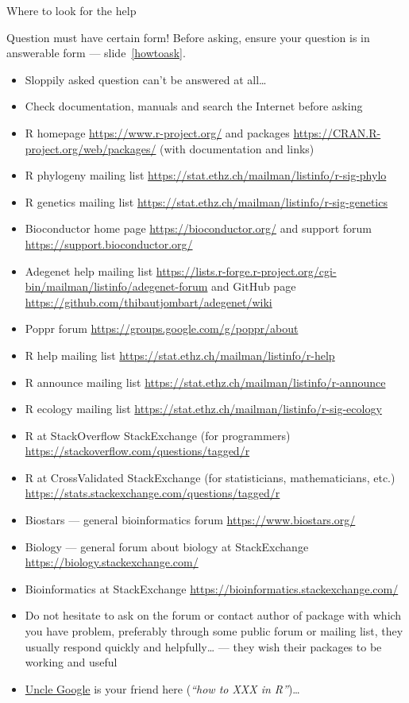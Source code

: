 \documentclass[compress, xelatex, 11pt, xcolor=svgnames, aspectratio=169,
	hyperref={
		bookmarks=true,
		unicode=true,
		colorlinks=true,
		pdftitle={Molecular data in R},
		plainpages=false,
		pdfauthor={Vojtech Zeisek},
		pdfsubject={Course about phylogeny and evolution in R},
		pdfcreator={XeLaTeX},
		pdfkeywords={R, evolution, phylogeny, molecular data},
		linkcolor=Crimson, %
		anchorcolor=Magenta, %
		citecolor=Magenta, %
		filecolor=Magenta, %
		menucolor=Magenta, %
		urlcolor=DodgerBlue, %
		},
	url={hyphens, lowtilde} %
	]{beamer}
\begin{document}
\begin{frame}[allowframebreaks]{Where to look for the help}
	\label{help}
	\begin{alertblock}{Question must have certain form!}
			Before asking, \alert{ensure your question is in answerable form} --- slide~\ref{howtoask}.
		\begin{itemize}
			\item Sloppily asked question can't be answered at all\ldots
			\item Check documentation, manuals and search the Internet before asking
		\end{itemize}
	\end{alertblock}
	\begin{itemize}
		\item R homepage \url{https://www.r-project.org/} and packages \url{https://CRAN.R-project.org/web/packages/} (with documentation and links)
		\item R phylogeny mailing list \url{https://stat.ethz.ch/mailman/listinfo/r-sig-phylo}
		\item R genetics mailing list \url{https://stat.ethz.ch/mailman/listinfo/r-sig-genetics}
		\item Bioconductor home page \url{https://bioconductor.org/} and support forum \url{https://support.bioconductor.org/}
		\item Adegenet help mailing list \url{https://lists.r-forge.r-project.org/cgi-bin/mailman/listinfo/adegenet-forum} and GitHub page \url{https://github.com/thibautjombart/adegenet/wiki}
		\item Poppr forum \url{https://groups.google.com/g/poppr/about}
		\item R help mailing list \url{https://stat.ethz.ch/mailman/listinfo/r-help}
		\item R announce mailing list \url{https://stat.ethz.ch/mailman/listinfo/r-announce}
		\item R ecology mailing list \url{https://stat.ethz.ch/mailman/listinfo/r-sig-ecology}
		\item R at StackOverflow StackExchange (for programmers) \url{https://stackoverflow.com/questions/tagged/r}
		\item R at CrossValidated StackExchange (for statisticians, mathematicians, etc.) \url{https://stats.stackexchange.com/questions/tagged/r}
		\item Biostars --- general bioinformatics forum \url{https://www.biostars.org/}
		\item Biology --- general forum about biology at StackExchange \url{https://biology.stackexchange.com/}
		\item Bioinformatics at StackExchange \url{https://bioinformatics.stackexchange.com/}
		\item Do not hesitate to ask on the forum or contact author of package with which you have problem, preferably through some public forum or mailing list, they usually respond quickly and helpfully\ldots{ }--- they wish their packages to be working and useful
		\item \href{https://rseek.org/}{Uncle Google} is your friend here (\textit{\enquote{how to XXX in R}})\ldots
	\end{itemize}
\end{frame}
\end{document}
